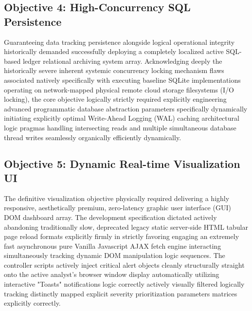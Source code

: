 \subsection{Objective 4: High-Concurrency SQL Persistence}
Guaranteeing data tracking persistence alongside logical operational integrity historically demanded successfully deploying a completely localized active SQL-based ledger relational archiving system array. Acknowledging deeply the historically severe inherent systemic concurrency locking mechanism flaws associated natively specifically with executing baseline SQLite implementations operating on network-mapped physical remote cloud storage filesystems (I/O locking), the core objective logically strictly required explicitly engineering advanced programmatic database abstraction parameters specifically dynamically initiating explicitly optimal Write-Ahead Logging (WAL) caching architectural logic pragmas handling intersecting reads and multiple simultaneous database thread writes seamlessly organically efficiently dynamically.

\subsection{Objective 5: Dynamic Real-time Visualization UI}
The definitive visualization objective physically required delivering a highly responsive, aesthetically premium, zero-latency graphic user interface (GUI) DOM dashboard array. The development specification dictated actively abandoning traditionally slow, deprecated legacy static server-side HTML tabular page reload formats explicitly firmly in strictly favoring engaging an extremely fast asynchronous pure Vanilla Javascript AJAX fetch engine interacting simultaneously tracking dynamic DOM manipulation logic sequences. The controller scripts actively inject critical alert objects cleanly structurally straight onto the active analyst's browser window display automatically utilizing interactive "Toasts" notifications logic correctly actively visually filtered logically tracking distinctly mapped explicit severity prioritization parameters matrices explicitly correctly.

